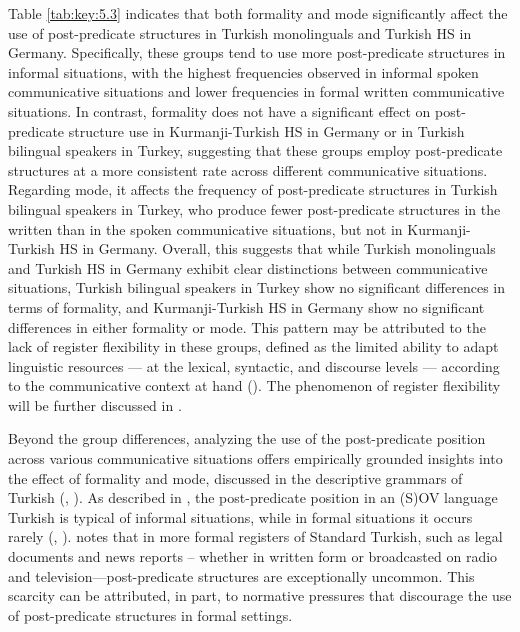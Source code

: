 Table \ref{tab:key:5.3} indicates that both formality and mode significantly affect the use of post-predicate structures in Turkish monolinguals and Turkish HS in Germany. Specifically, these groups tend to use more post-predicate structures in informal situations, with the highest frequencies observed in informal spoken communicative situations and lower frequencies in formal written communicative situations. In contrast, formality does not have a significant effect on post-predicate structure use in Kurmanji-Turkish HS in Germany or in Turkish bilingual speakers in Turkey, suggesting that these groups employ post-predicate structures at a more consistent rate across different communicative situations. Regarding mode, it affects the frequency of post-predicate structures in Turkish bilingual speakers in Turkey, who produce fewer post-predicate structures in the written than in the spoken communicative situations, but not in Kurmanji-Turkish HS in Germany. Overall, this suggests that while Turkish monolinguals and Turkish HS in Germany exhibit clear distinctions between communicative situations, Turkish bilingual speakers in Turkey show no significant differences in terms of formality, and Kurmanji-Turkish HS in Germany show no significant differences in either formality or mode. This pattern may be attributed to the lack of register flexibility in these groups, defined as the limited ability to adapt linguistic resources — at the lexical, syntactic, and discourse levels — according to the communicative context at hand (\citealt{QinUccelli2020}). The phenomenon of register flexibility will be further discussed in .

Beyond the group differences, analyzing the use of the post-predicate position across various communicative situations offers empirically grounded insights into the effect of formality and mode, discussed in the descriptive grammars of Turkish (\citealt{Erguvanli1984}, \citealt{Kornfilt1997}). As described in , the post-predicate position in an (S)OV language Turkish is typical of informal situations, while in formal situations it occurs rarely (\citealt{Erguvanli1984}, \citealt{Schroeder1995}). \citet{Erguvanli1984} notes that in more formal registers of Standard Turkish, such as legal documents and news reports -- whether in written form or broadcasted on radio and television—post-predicate structures are exceptionally uncommon. This scarcity can be attributed, in part, to normative pressures that discourage the use of post-predicate structures in formal settings.

